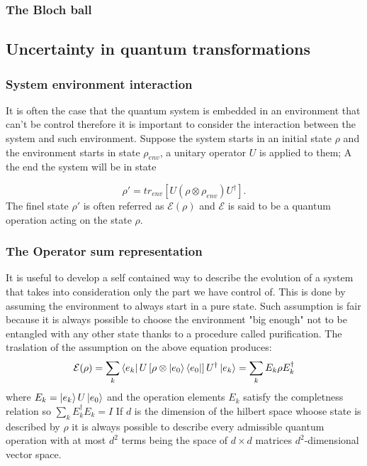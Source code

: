 \documentclass{article}
\begin{document}
\subsubsection{The Bloch ball}


\subsection{Uncertainty in quantum transformations}

\subsubsection{System environment interaction}

It is often the case that the quantum system is embedded in an environment
that can't be control therefore it is important to consider the interaction
between the system and such environment.
Suppose the system starts in an initial state $\rho$ and the environment
starts in state $\rho_{env}$,
a unitary operator $U$ is
applied to them;
A the end the system will be in state

\begin{equation}
	\rho' = tr_{env} \left[U (\rho \otimes \rho_{env})U^\dag \right].
\end{equation}
The finel state $\rho'$ is often referred as $\mathcal {E}(\rho)$ and
$\mathcal {E}$ is said to be a quantum operation acting on the state $\rho$.

\subsubsection{The Operator sum representation}

It is useful to develop a self contained way to describe the evolution
of a system that takes into consideration only the part we have control of.
This is done by assuming the environment to always start in a pure state.
Such assumption is fair because it is always possible to choose the environment
"big enough" not to be entangled with any other state thanks to a procedure
called purification.
The traslation of the assumption on the above equation produces:
\begin{equation}
	\mathcal{E}(\rho) =  \sum_{k} \bra{e_k}U \left[ \rho \otimes \ket{e_0}\bra{e_0}
		\right] U^\dagger \ket{e_k} = \sum_k E_k \rho E_k^\dagger  \\
\end{equation}
where $E_k=\ket{e_k}U\ket{e_0}$ and the operation elements $E_k$ satisfy
the completness relation so $\sum_k E_k^\dagger E_k = I$
If $d$ is the dimension of the hilbert space whoose state is described by
$\rho$ it is always possible to describe every admissible quantum operation
with at most $d^2$ terms being the space of $d \times d $ matrices $d^2$-dimensional
vector space.
\end{document}
